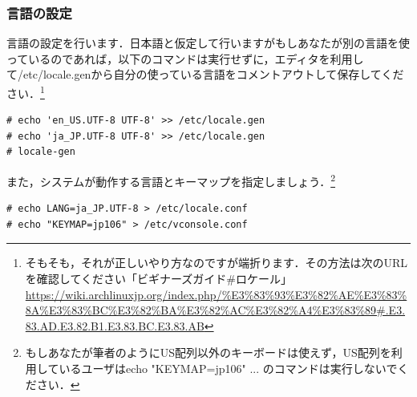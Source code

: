 \documentclass[b5j,twoside,openany]{jsbook}
\begin{document}
      \subsubsection{言語の設定}
        言語の設定を行います．日本語と仮定して行いますがもしあなたが別の言語を使っているのであれば，以下のコマンドは実行せずに，エディタを利用して/etc/locale.genから自分の使っている言語をコメントアウトして保存してください．\footnote{そもそも，それが正しいやり方なのですが端折ります．その方法は次のURLを確認してください「ビギナーズガイド\#ロケール」 \url{https://wiki.archlinuxjp.org/index.php/%E3%83%93%E3%82%AE%E3%83%8A%E3%83%BC%E3%82%BA%E3%82%AC%E3%82%A4%E3%83%89#.E3.83.AD.E3.82.B1.E3.83.BC.E3.83.AB}}
        \begin{screen}
\begin{verbatim}
# echo 'en_US.UTF-8 UTF-8' >> /etc/locale.gen
# echo 'ja_JP.UTF-8 UTF-8' >> /etc/locale.gen
# locale-gen
\end{verbatim}
        \end{screen}
        また，システムが動作する言語とキーマップを指定しましょう．\footnote{もしあなたが筆者のようにUS配列以外のキーボードは使えず，US配列を利用しているユーザはecho "KEYMAP=jp106" ... のコマンドは実行しないでください．}
        \begin{screen}
\begin{verbatim}
# echo LANG=ja_JP.UTF-8 > /etc/locale.conf
# echo "KEYMAP=jp106" > /etc/vconsole.conf
\end{verbatim}
        \end{screen}
\end{document}
